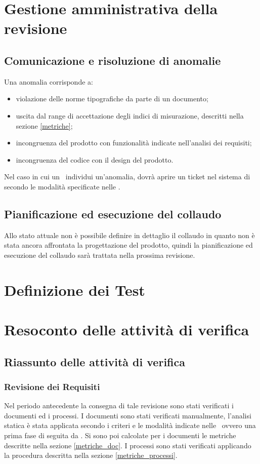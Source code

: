 \documentclass[12pt,a4paper]{article}
\begin{document}
\newpage
\section{Gestione amministrativa della revisione}
\subsection{Comunicazione e risoluzione di anomalie}
Una anomalia corrisponde a:
\begin{itemize}
\item violazione delle norme tipografiche da parte di un documento;
\item uscita dal range di accettazione degli indici di misurazione, descritti nella sezione \ref{metriche};
\item incongruenza del prodotto con funzionalità indicate nell'analisi dei requisiti;
\item incongruenza del codice con il design del prodotto.
\end{itemize}
Nel caso in cui un \VR\ individui un'anomalia, dovrà aprire un ticket nel sistema di  secondo le modalità specificate nelle \NdP.
\subsection{Pianificazione ed esecuzione del collaudo}
Allo stato attuale non è possibile definire in dettaglio il collaudo in quanto non è stata ancora affrontata la progettazione del prodotto, quindi la pianificazione ed esecuzione del collaudo sarà trattata nella prossima revisione.
\newpage
\section{Definizione dei Test}

\newpage
\appendix
\section{Resoconto delle attività di verifica} \label{Resoconto delle attività di verifica}
\subsection{Riassunto delle attività di verifica} 
\subsubsection{Revisione dei Requisiti}
Nel periodo antecedente la consegna di tale revisione sono stati verificati i documenti ed i processi.
I documenti sono stati verificati manualmente, l'analisi statica è stata applicata secondo i criteri e le modalità indicate nelle \NdP\, ovvero una prima fase di  seguita da .
Si sono poi calcolate per i documenti le metriche descritte nella sezione \ref{metriche_doc}.
I processi sono stati verificati applicando la procedura descritta nella sezione \ref{metriche_processi}.
\end{document}
